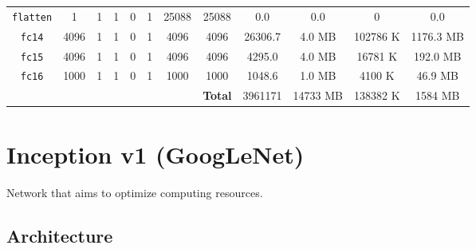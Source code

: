 \begin{table}[H]
\begin{tabular}{cccccccccccc}
        \cmidrule(lr){1-12}
        \texttt{flatten} & 1    & 1  & 1  & 0  & 1   & \num{25088} & \num{25088}   & \num{0.0}      & \num{0.0}               & \num{0}                & \num{0.0}                \\
        \texttt{fc14}    & 4096 & 1  & 1  & 0  & 1   & \num{4096}  & \num{4096}    & \num{26306.7}  & \num{4.0} {\tiny MB}    & \num{102786} {\tiny K} & \num{1176.3} {\tiny MB}  \\
        \texttt{fc15}    & 4096 & 1  & 1  & 0  & 1   & \num{4096}  & \num{4096}    & \num{4295.0}   & \num{4.0} {\tiny MB}    & \num{16781} {\tiny K}  & \num{192.0} {\tiny MB}   \\
        \texttt{fc16}    & 1000 & 1  & 1  & 0  & 1   & \num{1000}  & \num{1000}    & \num{1048.6}   & \num{1.0} {\tiny MB}    & \num{4100} {\tiny K}   & \num{46.9} {\tiny MB}    \\
        \midrule
        &&&&&&& \textbf{Total} & \num{3961171} & \num{14733} {\tiny MB} & \num{138382} {\tiny K} & \num{1584} {\tiny MB} \\
        \bottomrule
    \end{tabular}
\end{table}



\section{Inception v1 (GoogLeNet)}

Network that aims to optimize computing resources.


\subsection{Architecture}


